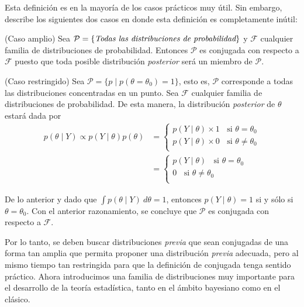 \documentclass[
  spanish,
  letter]{book}
\theoremstyle{definition}
\theoremstyle{definition}
\theoremstyle{definition}
\theoremstyle{remark}
\begin{document}
Esta definición es en la mayoría de los casos prácticos muy útil. Sin embargo,  describe los siguientes dos casos en donde esta definición es completamente inútil:

\item

(Caso amplio) Sea \(\mathcal{P}=\{\emph{Todas las distribuciones de probabilidad}\}\) y \(\mathcal{F}\) cualquier familia de distribuciones de probabilidad. Entonces \(\mathcal{P}\) es conjugada con respecto a \(\mathcal{F}\) puesto que toda posible distribución \emph{posterior} será un miembro de \(\mathcal{P}\).

\item

(Caso restringido) Sea \(\mathcal{P}=\{p \mid p(\theta=\theta_0)=1\}\), esto es, \(\mathcal{P}\) corresponde a todas las distribuciones concentradas en un punto. Sea \(\mathcal{F}\) cualquier familia de distribuciones de probabilidad. De esta manera, la distribución \emph{posterior} de \(\theta\) estará dada por
\begin{align*}
    p(\theta \mid Y)\propto
    p(Y \mid \theta)p(\theta)
    &=
    \begin{cases}
    p(Y \mid \theta)\times 1 \ \ \ \ \text{si $\theta=\theta_0$}\\
    p(Y \mid \theta)\times 0 \ \ \ \ \text{si $\theta\neq\theta_0$}\\
    \end{cases}\\
    &=
    \begin{cases}
    p(Y \mid \theta) \ \ \ \ \text{si $\theta=\theta_0$}\\
    0           \ \ \ \ \text{si $\theta\neq\theta_0$}\\
    \end{cases}
    \end{align*}

De lo anterior y dado que \(\int p(\theta \mid Y)\ d\theta=1\), entonces \(p(Y \mid \theta)=1\) si y sólo si \(\theta=\theta_0\). Con el anterior razonamiento, se concluye que \(\mathcal{P}\) es conjugada con respecto a \(\mathcal{F}\).

Por lo tanto, se deben buscar distribuciones \emph{previa} que sean conjugadas de una forma tan amplia que permita proponer una distribución \emph{previa} adecuada, pero al mismo tiempo tan restringida para que la definición de conjugada tenga sentido práctico. Ahora introducimos una familia de distribuciones muy importante para el desarrollo de la teoría estadística, tanto en el ámbito bayesiano como en el clásico.
\end{document}
